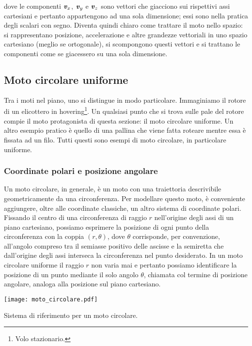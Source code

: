 \noindent dove le componenti $\textbf{\textit{v}}_x$, $\textbf{\textit{v}}_y$ e
$\textbf{\textit{v}}_z$ sono vettori che giacciono sui rispettivi assi
cartesiani e pertanto appartengono ad una sola dimensione; essi
sono nella pratica degli scalari con segno. Diventa
quindi chiaro come trattare il moto nello spazio: si rappresentano
posizione, accelerazione e altre grandezze vettoriali in uno
spazio cartesiano (meglio se ortogonale), si scompongono questi
vettori e si trattano le componenti come se giacessero su una
sola dimensione.




\subsection{Moto circolare uniforme}
Tra i moti nel piano, uno si distingue in modo particolare.
Immaginiamo il rotore di un elicottero in hovering\footnote{Volo stazionario.}.
Un qualsiasi punto che si trova sulle pale del rotore compie il moto
protagonista di questa sezione: il moto circolare uniforme. Un altro esempio pratico è
quello di una pallina che viene fatta roteare mentre essa è fissata
ad un filo. Tutti questi sono esempi di moto circolare, in particolare
uniforme.

\subsubsection*{Coordinate polari e posizione angolare}
Un moto circolare, in generale, è un moto con una traiettoria descrivibile
geometricamente da una circonferenza. Per modellare questo moto, è
conveniente aggiungere, oltre alle coordinate classiche, un altro
sistema di coordinate polari. Fissando il centro di una circonferenza
di raggio $r$ nell'origine degli assi di un piano cartesiano, possiamo
esprimere la posizione di ogni punto della circonferenza con la coppia
$(r, \theta)$, dove $\theta$ corrisponde, per convenzione, all'angolo compreso tra
il semiasse positivo delle ascisse e la semiretta che dall'origine degli
assi interseca la circonferenza nel punto desiderato. In un moto
circolare uniforme il raggio $r$ non varia mai e pertanto possiamo
identificare la posizione di un punto mediante il solo angolo $\theta$,
chiamata col termine di posizione angolare, analoga alla posizione
sul piano cartesiano.

\begin{marginfigure}
    \centering
    \texttt{[image: moto\_circolare.pdf]}
    \caption{Sistema di riferimento per un moto circolare.}
    \label{circref}
\end{marginfigure}


